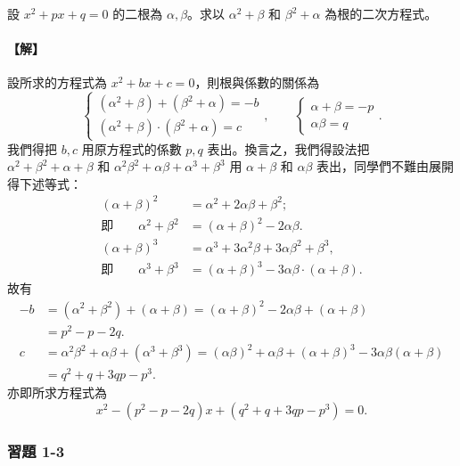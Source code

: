 \begin{example}\label{ex:b2_1-3-5}
設 $x^2+px+q=0$ 的二根為 $\alpha, \beta$。求以 $\alpha^2+\beta$ 和 $\beta^2+\alpha$ 為根的二次方程式。
\end{example}
\paragraph{【解】}
設所求的方程式為 $x^2+bx+c=0$，則根與係數的關係為
\[
\begin{cases}
(\alpha^2+\beta)+(\beta^2+\alpha) = -b \\
(\alpha^2+\beta)\cdot(\beta^2+\alpha) = c
\end{cases}, \qquad
\begin{cases}
\alpha+\beta = -p \\
\alpha\beta = q
\end{cases}.
\]
我們得把 $b, c$ 用原方程式的係數 $p, q$ 表出。換言之，我們得設法把 $\alpha^2+\beta^2+\alpha+\beta$ 和 $\alpha^2\beta^2+\alpha\beta+\alpha^3+\beta^3$ 用 $\alpha+\beta$ 和 $\alpha\beta$ 表出，同學們不難由展開得下述等式：
\begin{align*}
(\alpha+\beta)^2 &= \alpha^2+2\alpha\beta+\beta^2; \\
\text{即}\qquad \alpha^2+\beta^2 &= (\alpha+\beta)^2-2\alpha\beta. \\
(\alpha+\beta)^3 &= \alpha^3+3\alpha^2\beta+3\alpha\beta^2+\beta^3, \\
\text{即}\qquad \alpha^3+\beta^3 &= (\alpha+\beta)^3-3\alpha\beta\cdot(\alpha+\beta).
\end{align*}
故有
\begin{align*}
-b &= (\alpha^2+\beta^2)+(\alpha+\beta) = (\alpha+\beta)^2-2\alpha\beta+(\alpha+\beta) \\
&= p^2-p-2q. \\
c &= \alpha^2\beta^2+\alpha\beta+(\alpha^3+\beta^3) = (\alpha\beta)^2+\alpha\beta+(\alpha+\beta)^3 - 3\alpha\beta(\alpha+\beta) \\
&= q^2+q+3qp-p^3.
\end{align*}
亦即所求方程式為
\[
x^2-(p^2-p-2q)x + (q^2+q+3qp-p^3) = 0.
\]


\subsubsection*{習題 1-3}\label{sec:b2_ex1-3}

